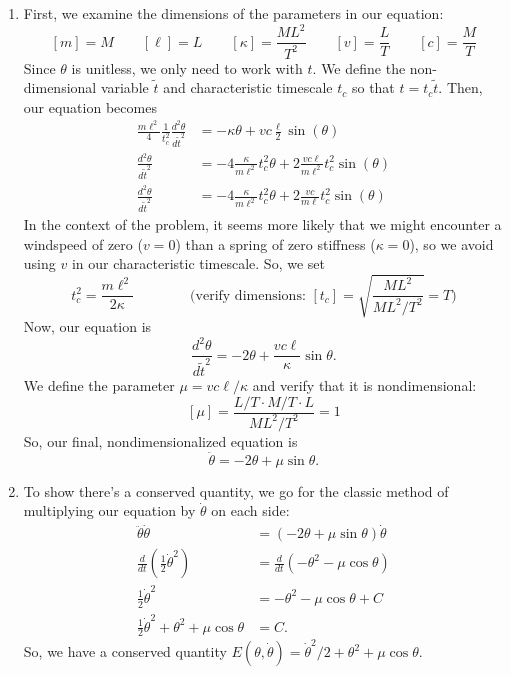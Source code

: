 \documentclass[10pt,letterpaper]{report}
\begin{document}
\begin{enumerate}
    \begin{enumerate}
        \item 
        First, we examine the dimensions of the parameters in our equation:
        \[
        [m] = M \qquad [\ell] = L \qquad [\kappa] = \frac{ML^2}{T^2} \qquad [v] = \frac{L}{T} \qquad [c] = \frac{M}{T}
        \]
        Since $\theta$ is unitless, we only need to work with $t$. We define the non-dimensional variable $\widetilde t$ and characteristic timescale $t_c$ so that $ t = t_c \widetilde t$. Then, our equation becomes
        \begin{align*}
            \frac{m\ell^2}{4}\frac{1}{t_c^2}\frac{d^2\theta}{d\widetilde t^2} 
            &= 
            -\kappa\theta + vc\frac{\ell}{2}\sin(\theta)
            \\
            \frac{d^2\theta}{d\widetilde t^2} 
            &= 
            -4\frac{\kappa}{m\ell^2}t_c^2\theta + 2\frac{vc\ell }{m\ell^2}t_c^2\sin(\theta)
            \\
            \frac{d^2\theta}{d\widetilde t^2} 
            &= 
            -4\frac{\kappa}{m\ell^2}t_c^2\theta + 2\frac{vc }{m\ell}t_c^2\sin(\theta)
        \end{align*}
        In the context of the problem, it seems more likely that we might encounter a windspeed of zero ($v = 0$) than a spring of zero stiffness ($\kappa = 0$), so we avoid using $v$ in our characteristic timescale. So, we set
        \[
        t_c^2 = \frac{m\ell^2}{2\kappa} 
        \qquad \qquad 
        \big(\textrm{verify dimensions: } \left[t_c\right] = \sqrt{\frac{ML^2}{ML^2/T^2}} = T\big)
        \]
        Now, our equation is
        \[
        \frac{d^2\theta}{d\widetilde t^2} = -2\theta + \frac{vc\ell}{\kappa}\sin\theta.
        \]
        We define the parameter $\mu = vc\ell/\kappa$ and verify that it is nondimensional:
        \[
        [\mu] = \frac{L/T \cdot M/T \cdot L}{ML^2/T^2} = 1
        \]
        So, our final, nondimensionalized equation is
        \[
        \ddot \theta = -2\theta + \mu \sin \theta.
        \]
        
        \item To show there's a conserved quantity, we go for the classic method of multiplying our equation by $\dot \theta$ on each side:
        \begin{align*}
            \ddot \theta \dot\theta
            &= 
            \left(-2\theta + \mu \sin \theta\right)\dot\theta
            \\
            \frac{d}{dt}\left(\frac{1}{2}\dot\theta^2\right)
            &=
            \frac{d}{dt}\left( -\theta^2 - \mu \cos\theta \right)
            \\
            \frac{1}{2}\dot\theta^2
            &=
            -\theta^2 - \mu \cos\theta + C
            \\
            \frac{1}{2}\dot\theta^2 + \theta^2 + \mu \cos\theta 
            &= 
            C.
        \end{align*}
        So, we have a conserved quantity $E(\theta, \dot \theta) = \dot\theta^2/2 + \theta^2 + \mu \cos\theta$.
        

\end{enumerate}
\end{enumerate}
\end{document}
